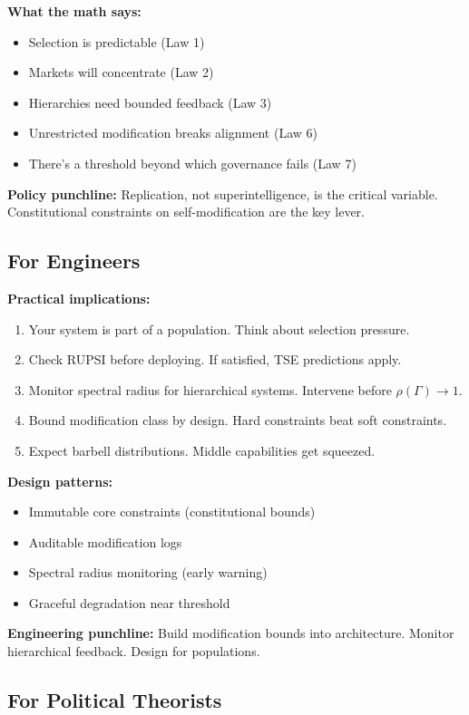 \documentclass[12pt]{article}
\begin{document}
\textbf{What the math says:}
\begin{itemize}[nosep]
\item Selection is predictable (Law 1)
\item Markets will concentrate (Law 2)
\item Hierarchies need bounded feedback (Law 3)
\item Unrestricted modification breaks alignment (Law 6)
\item There's a threshold beyond which governance fails (Law 7)
\end{itemize}

\textbf{Policy punchline:} Replication, not superintelligence, is the critical variable. Constitutional constraints on self-modification are the key lever.

\subsection{For Engineers}

\textbf{Practical implications:}
\begin{enumerate}[nosep]
\item Your system is part of a population. Think about selection pressure.
\item Check RUPSI before deploying. If satisfied, TSE predictions apply.
\item Monitor spectral radius for hierarchical systems. Intervene before $\rho(\Gamma) \to 1$.
\item Bound modification class by design. Hard constraints beat soft constraints.
\item Expect barbell distributions. Middle capabilities get squeezed.
\end{enumerate}

\textbf{Design patterns:}
\begin{itemize}[nosep]
\item Immutable core constraints (constitutional bounds)
\item Auditable modification logs
\item Spectral radius monitoring (early warning)
\item Graceful degradation near threshold
\end{itemize}

\textbf{Engineering punchline:} Build modification bounds into architecture. Monitor hierarchical feedback. Design for populations.

\subsection{For Political Theorists}
\end{document}
